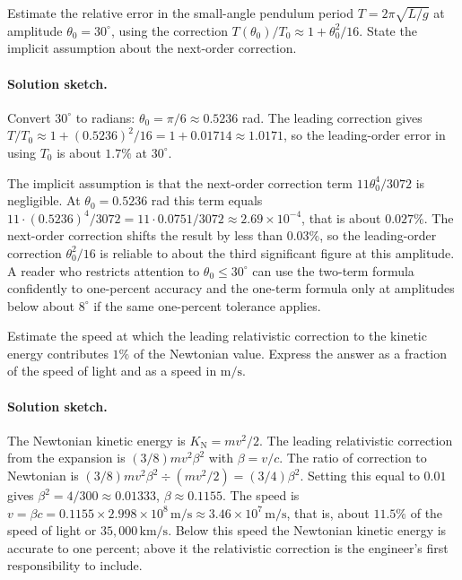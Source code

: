 \begin{exercise}
Estimate the relative error in the small-angle pendulum period $T = 2
\pi \sqrt{L/g}$ at amplitude $\theta_{0} = 30^{\circ}$, using the
correction $T(\theta_{0})/T_{0} \approx 1 + \theta_{0}^{2}/16$. State
the implicit assumption about the next-order correction.

\paragraph{Solution sketch.} Convert $30^{\circ}$ to radians:
$\theta_{0} = \pi/6 \approx 0.5236$ rad. The leading correction
gives $T/T_{0} \approx 1 + (0.5236)^{2}/16 = 1 + 0.01714 \approx
1.0171$, so the leading-order error in using $T_{0}$ is about
$1.7\%$ at $30^{\circ}$.

The implicit assumption is that the next-order correction term
$11 \theta_{0}^{4}/3072$ is negligible. At $\theta_{0} = 0.5236$ rad
this term equals $11 \cdot (0.5236)^{4}/3072 = 11 \cdot 0.0751/3072
\approx 2.69 \times 10^{-4}$, that is about $0.027\%$. The
next-order correction shifts the result by less than $0.03\%$, so
the leading-order correction $\theta_{0}^{2}/16$ is reliable to about
the third significant figure at this amplitude. A reader who
restricts attention to $\theta_{0} \leq 30^{\circ}$ can use the
two-term formula confidently to one-percent accuracy and the
one-term formula only at amplitudes below about $8^{\circ}$ if the
same one-percent tolerance applies.
\end{exercise}

\begin{exercise}
Estimate the speed at which the leading relativistic correction to
the kinetic energy contributes $1\%$ of the Newtonian value. Express
the answer as a fraction of the speed of light and as a speed in
$\si{\meter\per\second}$.

\paragraph{Solution sketch.} The Newtonian kinetic energy is
$K_{\text{N}} = m v^{2}/2$. The leading relativistic correction
from the expansion is $(3/8) m v^{2} \beta^{2}$ with $\beta = v/c$.
The ratio of correction to Newtonian is $(3/8) m v^{2} \beta^{2}
\div (m v^{2}/2) = (3/4) \beta^{2}$. Setting this equal to $0.01$
gives $\beta^{2} = 4/300 \approx 0.01333$, $\beta \approx 0.1155$.
The speed is $v = \beta c = 0.1155 \times 2.998 \times 10^{8}\,
\si{\meter\per\second} \approx 3.46 \times 10^{7}\,
\si{\meter\per\second}$, that is, about $11.5\%$ of the speed of
light or $35{,}000\,\si{\kilo\meter\per\second}$. Below this speed
the Newtonian kinetic energy is accurate to one percent; above it
the relativistic correction is the engineer's first responsibility
to include.
\end{exercise}

